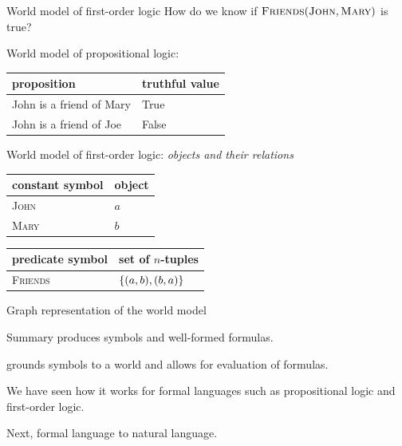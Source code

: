\documentclass[usenames,dvipsnames,notes]{beamer}
\begin{document}
\begin{frame}
    {World model of first-order logic}
    How do we know if $\textsc{Friends}(\textsc{John}, \textsc{Mary})$ is true?

    World model of propositional logic:\\
    \begin{table}
        \begin{tabular}{ll}
            proposition & truthful value \\
            \midrule
            John is a friend of Mary & True\\
            John is a friend of Joe & False
        \end{tabular}
    \end{table}

    World model of first-order logic: \emph{objects and their relations}\\
    \begin{table}
        \begin{tabular}{ll}
            constant symbol & object \\
            \midrule
            \textsc{John} & $a$ \\
             \textsc{Mary} & $b$ \\
        \end{tabular}
    \end{table}
    \vspace{-1.5em}
    \begin{table}
        \begin{tabular}{ll}
            predicate symbol & set of $n$-tuples \\
            \midrule
            \textsc{Friends} & $\left\{ (a,b), (b,a) \right\}$ \\
        \end{tabular}
    \end{table}
\end{frame}

\begin{frame}
    {Graph representation of the world model}
\end{frame}

\begin{frame}
    {Summary}
     produces symbols and well-formed formulas.

     grounds symbols to a world and allows for evaluation of formulas.

    We have seen how it works for formal languages such as propositional logic and first-order logic.

    Next, formal language to natural language.
\end{frame}
\end{document}
